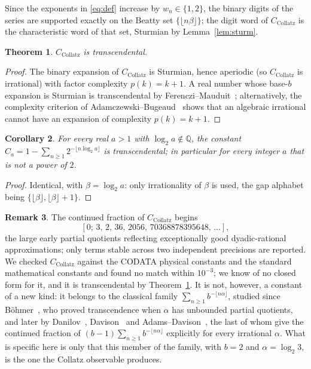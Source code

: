 \documentclass[11pt,a4paper]{article}
\theoremstyle{plain}
\newtheorem{theorem}{Theorem}[section]
\newtheorem{corollary}[theorem]{Corollary}
\theoremstyle{definition}
\newtheorem{remark}[theorem]{Remark}
\newcommand{\CC}{C_{\mathrm{Collatz}}}
\begin{document}
Since the exponents in \eqref{eq:def} increase by $w_{n}\in\{1,2\}$, the binary digits of the
series are supported exactly on the Beatty set $\{\lfloor n\beta\rfloor\}$; the digit word of
$\CC$ is the characteristic word of that set, Sturmian by Lemma~\ref{lem:sturm}.

\begin{theorem}\label{thm:trans}
$\CC$ is transcendental.
\end{theorem}
\begin{proof}
The binary expansion of $\CC$ is Sturmian, hence aperiodic (so $\CC$ is irrational) with
factor complexity $p(k)=k+1$. A real number whose base-$b$ expansion is Sturmian is
transcendental by Ferenczi--Mauduit~\cite{fm}; alternatively, the complexity criterion of
Adamczewski--Bugeaud~\cite{ab} shows that an algebraic irrational cannot have an expansion of
complexity $p(k)=k+1$.
\end{proof}

\begin{corollary}
For every real $a>1$ with $\log_{2}a\notin\mathbb{Q}$, the constant
$C_{a}=1-\sum_{n\ge1}2^{-\lfloor n\log_{2}a\rfloor}$ is transcendental; in particular for
every integer $a$ that is not a power of $2$.
\end{corollary}
\begin{proof}
Identical, with $\beta=\log_{2}a$: only irrationality of $\beta$ is used, the gap alphabet
being $\{\lfloor\beta\rfloor,\lfloor\beta\rfloor+1\}$.
\end{proof}

\begin{remark}
The continued fraction of $\CC$ begins
\[
  [0;\,3,\,2,\,36,\,2056,\,70368878395648,\,\dots],
\]
the large early partial quotients reflecting exceptionally good dyadic-rational
approximations; only terms stable across two independent precisions are reported. We checked
$\CC$ against the CODATA physical constants and the standard mathematical constants and found
no match within $10^{-3}$; we know of no closed form for it, and it is transcendental by Theorem~\ref{thm:trans}. It is
not, however, a constant of a new kind: it belongs to the classical family
$\sum_{n\ge1} b^{-\lfloor n\alpha\rfloor}$, studied since B\"ohmer~\cite{bohmer}, who proved
transcendence when $\alpha$ has unbounded partial quotients, and later by
Danilov~\cite{danilov}, Davison~\cite{davison} and Adams--Davison~\cite{adamsdavison}, the last
of whom give the continued fraction of $(b-1)\sum_{n\ge1} b^{-\lfloor n\alpha\rfloor}$
explicitly for every irrational $\alpha$. What is specific here is only that this member of
the family, with $b=2$ and $\alpha=\log_2 3$, is the one the Collatz observable produces.
\end{remark}
\end{document}
